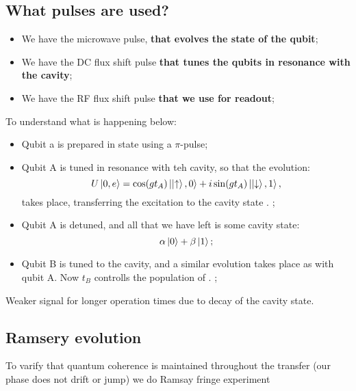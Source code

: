   \subsection{What pulses are used?}
   \begin{itemize}
   	\item We have the microwave pulse, \textbf{that evolves the state of the qubit};
   	\item We have the DC flux shift pulse \textbf{that tunes the qubits in resonance with the cavity};
   	\item We have the RF flux shift pulse \textbf{that we use for readout};
   \end{itemize}

	
	To understand what is happening below:
	\begin{itemize}
		\item Qubit a is prepared in state \iup{} using a $ \pi $-pulse;
		\item Qubit A is tuned in resonance with teh cavity, so that the evolution:
		\[
				U\Ket{0,e} = \cos(gt_A)\Ket{\Ket{\uparrow},0} + i\sin(gt_A)\Ket{\Ket{\downarrow},1},
		\]
		\noindent takes place, transferring the excitation to the cavity state . ;
		\item Qubit A is detuned, and all that we have left is some cavity state:
		\[
			\alpha\Ket{0}+\beta\Ket{1};
		\]
		\item Qubit B is tuned to the cavity, and a similar evolution takes place as with qubit A. Now $ t_B $ controlls the population of \iup{}. ;
	\end{itemize}
Weaker signal for longer operation times due to decay of the cavity state.

 \subsection{Ramsery evolution}
  To varify that quantum coherence is maintained throughout the transfer (our phase does not drift or jump) we do Ramsay fringe experiment
  
